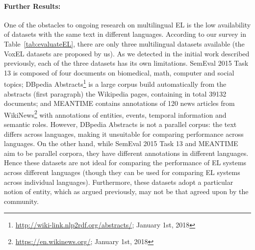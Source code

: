 \documentclass[sigconf]{acmart}
\begin{document}
\paragraph{Further Results:} One of the obstacles to ongoing research on multilingual EL is the low availability of datasets with the same text in different languages. According to our survey in Table~\ref{tab:evaluateEL}, there are only three multilingual datasets available (the VoxEL datasets are proposed by us). As we detected in the initial work described previously, each of the three datasets has its own limitations. SemEval 2015 Task 13 is composed of four documents on biomedical, math, computer and social topics; DBpedia Abstracts\footnote{\url{http://wiki-link.nlp2rdf.org/abstracts/}; January 1st, 2018} is a large corpus build automatically from the abstracts (first paragraph) the Wikipedia pages, containing in total 39132 documents; and MEANTIME contains annotations of 120 news articles from WikiNews\footnote{\url{https://en.wikinews.org/}; January 1st, 2018} with annotations of entities, events, temporal information and semantic roles. However, DBpedia Abstracts is not a parallel corpus: the text differs across languages, making it unsuitable for comparing performance across languages. On the other hand, while SemEval 2015 Task 13 and MEANTIME aim to be parallel corpora, they have different annotations in different languages. Hence these datasets are not ideal for comparing the performance of EL systems across different languages (though they can be used for comparing EL systems across individual languages). Furthermore, these datasets adopt a particular notion of entity, which as argued previously, may not be that agreed upon by the community.
\end{document}

